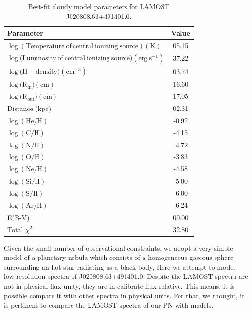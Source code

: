 \documentclass[fleqn,usenatbib]{mnras}
\begin{document}
\begin{table}
	\centering
	\caption{Best-fit {\sc cloudy} model parameters for LAMOST J020808.63+491401.0.}
	\label{tab:parameter-best-fit}
	\begin{tabular}{lc} %
                \hline
		\hline
		Parameter & Value \\
                \hline
		$\log(\mathrm{Temperature~of~central~ionizing~source}) (\mathrm{K})$  & 05.15  \\
		$\log(\mathrm{Luminosity~of~central~ionizing~source) (erg~s^{-1})}$ & 37.22 \\
		$\log(\mathrm{H-density) (cm^{-3})} $ & 03.74  \\
                 $\log(\mathrm{R_{in}) (cm)}$ & 16.60\\
                $\log(\mathrm{R_{out}) (cm)}$ & 17.05 \\
                Distance (kpc) & 02.31  \\
                $\log(\mathrm{He/H})$ & -0.92 \\
                $\log(\mathrm{C/H})$ & -4.15 \\
                $\log(\mathrm{N/H})$ & -4.72 \\
                $\log(\mathrm{O/H})$ &  -3.83\\ 
                $\log(\mathrm{Ne/H})$ & -4.58 \\
                $\log(\mathrm{Si/H})$ & -5.00\\ 
                $\log(\mathrm{S/H})$ &  -6.00\\ 
                $\log(\mathrm{Ar/H})$ & -6.24\\
                \hline
                E(B-V) & 00.00 \\
                 Total $\chi^2$ & 32.80  \\
                 
                 \hline
	\end{tabular}
\end{table}

Given the small number of observational constraints, we adopt a very
simple model of a planetary nebula which consists of a homogeneous
gaseous sphere surrounding an hot star radiating as a black body,
Here we attempt to model low-resolution spectra of J020808.63+491401.0.
Despite the LAMOST spectra are not in physical flux unity,
they are in calibrate flux relative. This means, it is possible compare it with other
spectra in physical units. For that, we thought, it is pertinent to
compare the LAMOST spectra of our PN with models.
\end{document}
